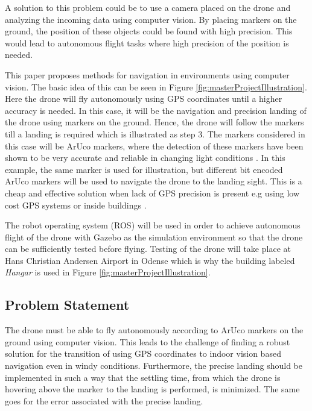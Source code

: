 \documentclass[../Head/Report.tex]{subfiles}
\begin{document}
A solution to this problem could be to use a camera placed on the drone and analyzing the incoming data using computer vision. By placing markers on the ground, the position of these objects could be found with high precision. This would lead to autonomous flight tasks where high precision of the position is needed.      

This paper proposes methods for navigation in environments using computer vision. The basic idea of this can be seen in Figure \ref{fig:masterProjectIllustration}. Here the drone will fly autonomously using GPS coordinates until a higher accuracy is needed. In this case, it will be the navigation and precision landing of the drone using markers on the ground. Hence, the drone will follow the markers till a landing is required which is illustrated as step 3. The markers considered in this case will be ArUco markers, where the detection of these markers have been shown to be very accurate and reliable in changing light conditions \cite{visualmarkers}. In this example, the same marker is used for illustration, but different bit encoded ArUco markers will be used to navigate the drone to the landing sight. This is a cheap and effective solution when lack of GPS precision is present e.g using low cost GPS systems or inside buildings \cite{Visual-Inertial-Navigation}. 

The robot operating system (ROS) will be used in order to achieve autonomous flight of the drone with Gazebo as the simulation environment so that the drone can be sufficiently tested before flying. Testing of the drone will take place at Hans Christian Andersen Airport in Odense which is why the building labeled \textit{Hangar} is used in Figure \ref{fig:masterProjectIllustration}.    

\subsection{Problem Statement}

The drone must be able to fly autonomously according to ArUco markers on the ground using computer vision. This leads to the challenge of finding a robust solution for the transition of using GPS coordinates to indoor vision based navigation even in windy conditions. Furthermore, the precise landing should be implemented in such a way that the settling time, from which the drone is hovering above the marker to the landing is performed, is minimized. The same goes for the error associated with the precise landing.  
\end{document}
